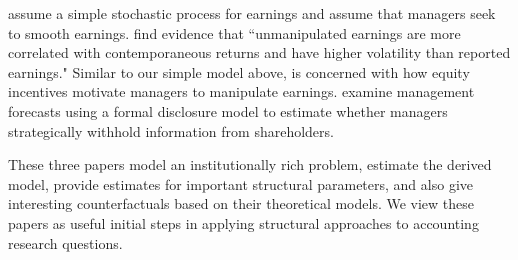 \citet{Gerakos:2013cl} assume a simple stochastic process for earnings and assume that managers seek to smooth earnings.
\citet[p.\,57]{Gerakos:2013cl} find evidence that ``unmanipulated earnings are more correlated with contemporaneous returns and have higher volatility than reported earnings."
Similar to our simple model above, \citet{Zakolyukina:2015aa} is concerned with how equity incentives motivate managers to manipulate earnings.  
\citet{Bertomeu:2015aa} examine management forecasts using a formal disclosure model to estimate whether managers strategically withhold information from shareholders.

These three papers model an institutionally rich problem, estimate the derived model, provide estimates for important structural parameters, and also give interesting counterfactuals based on their theoretical models.  
We view these papers as useful initial steps in applying structural approaches to accounting research questions.
